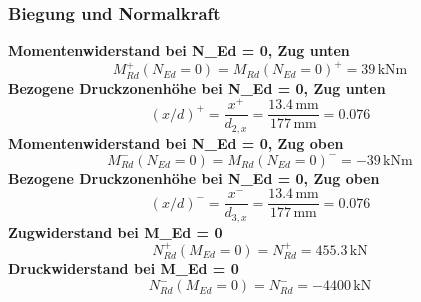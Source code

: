 \documentclass[11pt,a4paper]{article}
\begin{document}
\subsubsection{Biegung und Normalkraft}
\noindent\textbf{Momentenwiderstand bei N\_Ed = 0, Zug unten}
\begin{equation*}
M_{Rd}^{+}(N_{Ed} = 0) = M_{Rd}(N_{Ed}=0)^{+} = 39\,\mathrm{kNm}
\end{equation*}
\noindent\textbf{Bezogene Druckzonenhöhe bei N\_Ed = 0, Zug unten}
\begin{equation*}
\left(x/d\right)^{+} = \frac{x^{+}}{d_{2,x}} = \frac{13.4\,\mathrm{mm}}{177\,\mathrm{mm}} = 0.076
\end{equation*}
\noindent\textbf{Momentenwiderstand bei N\_Ed = 0, Zug oben}
\begin{equation*}
M_{Rd}^{-}(N_{Ed} = 0) = M_{Rd}(N_{Ed}=0)^{-} = -39\,\mathrm{kNm}
\end{equation*}
\noindent\textbf{Bezogene Druckzonenhöhe bei N\_Ed = 0, Zug oben}
\begin{equation*}
\left(x/d\right)^{-} = \frac{x^{-}}{d_{3,x}} = \frac{13.4\,\mathrm{mm}}{177\,\mathrm{mm}} = 0.076
\end{equation*}
\noindent\textbf{Zugwiderstand bei M\_Ed = 0}
\begin{equation*}
N_{Rd}^{+}(M_{Ed} = 0) = N_{Rd}^{+} = 455.3\,\mathrm{kN}
\end{equation*}
\noindent\textbf{Druckwiderstand bei M\_Ed = 0}
\begin{equation*}
N_{Rd}^{-}(M_{Ed} = 0) = N_{Rd}^{-} = -4400\,\mathrm{kN}
\end{equation*}
\end{document}
